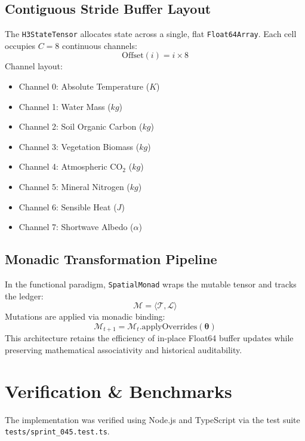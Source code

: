 \documentclass[twocolumn,10pt]{article}
\begin{document}
\subsection{Contiguous Stride Buffer Layout}
The \texttt{H3StateTensor} allocates state across a single, flat \texttt{Float64Array}. Each cell occupies $C=8$ continuous channels:
\begin{equation}
\text{Offset}(i) = i \times 8
\end{equation}
Channel layout:
\begin{itemize}
    \item Channel 0: Absolute Temperature ($K$)
    \item Channel 1: Water Mass ($kg$)
    \item Channel 2: Soil Organic Carbon ($kg$)
    \item Channel 3: Vegetation Biomass ($kg$)
    \item Channel 4: Atmospheric $\text{CO}_2$ ($kg$)
    \item Channel 5: Mineral Nitrogen ($kg$)
    \item Channel 6: Sensible Heat ($J$)
    \item Channel 7: Shortwave Albedo ($\alpha$)
\end{itemize}

\subsection{Monadic Transformation Pipeline}
In the functional paradigm, \texttt{SpatialMonad} wraps the mutable tensor and tracks the ledger:
\begin{equation}
\mathcal{M} = \langle \mathcal{T}, \mathcal{L} \rangle
\end{equation}
Mutations are applied via monadic binding:
\begin{equation}
\mathcal{M}_{t+1} = \mathcal{M}_t.\text{applyOverrides}(\mathbf{\theta})
\end{equation}
This architecture retains the efficiency of in-place Float64 buffer updates while preserving mathematical associativity and historical auditability.

\section{Verification \& Benchmarks}
The implementation was verified using Node.js and TypeScript via the test suite \texttt{tests/sprint\_045.test.ts}.
\end{document}
